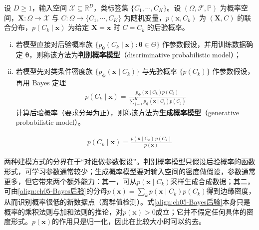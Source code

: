 \documentclass[../main.tex]{subfiles}
\begin{document}
\begin{definition}[判别概率模型与生成概率模型]\label{definition:ch05-生成与判别概率模型}
设 $D\geqslant1$，输入空间 $\mathcal{X}\subseteq\mathbb{R}^{D}$，类标签集 $\{C_1,\cdots,C_K\}$。设 $(\Omega,\mathcal{F},\mathbb{P})$ 为概率空间，$\boldsymbol{X}:\Omega\to\mathcal{X}$ 与 $C:\Omega\to\{C_1,\cdots,C_K\}$ 为随机变量，$p(\boldsymbol{x},C_k)$ 为 $(\boldsymbol{X},C)$ 的联合分布，$p(C_k\mid\boldsymbol{x})$ 为给定 $\boldsymbol{X}=\boldsymbol{x}$ 时 $C=C_k$ 的后验概率。
\begin{enumerate}[(i)]
  \item 若模型直接对后验概率族 $\{p_{\boldsymbol{\theta}}(C_k\mid\boldsymbol{x}):\boldsymbol{\theta}\in\Theta\}$ 作参数假设，并用训练数据确定 $\boldsymbol{\theta}$，则称该方法为\textbf{判别概率模型}（discriminative probabilistic model）；
  \item 若模型先对类条件密度族 $\{p_{\boldsymbol{\phi}}(\boldsymbol{x}\mid C_k)\}$ 与先验概率 $\{p(C_k)\}$ 作参数假设，再用 Bayes 定理
  \begin{align*}
    p(C_k\mid\boldsymbol{x})=\frac{p_{\boldsymbol{\phi}}(\boldsymbol{x}\mid C_k)p(C_k)}{\sum_{j=1}^{K}p_{\boldsymbol{\phi}}(\boldsymbol{x}\mid C_j)p(C_j)}
  \end{align*}
  计算后验概率（要求分母为正），则称该方法为\textbf{生成概率模型}（generative probabilistic model）。
\end{enumerate}
\end{definition}

\begin{align}
  p(C_k\mid\boldsymbol{x})=\frac{p(\boldsymbol{x}\mid C_k)\,p(C_k)}{p(\boldsymbol{x})}
  \label{align:ch05-Bayes后验}
\end{align}

\begin{remark}
两种建模方式的分界在于“对谁做参数假设”。判别概率模型只假设后验概率的函数形式，可学习参数通常较少；生成概率模型要对输入空间的密度做假设，参数通常更多，但它带来两个额外能力：其一，可从$p(\boldsymbol{x}\mid C_k)$采样生成合成数据；其二，可由\eqref{align:ch05-Bayes后验}的分母$p(\boldsymbol{x})=\sum_k p(\boldsymbol{x}\mid C_k)p(C_k)$得到边缘密度，从而识别概率很低的新数据点（离群值检测）。式\eqref{align:ch05-Bayes后验}本身只是概率的乘积法则与加和法则的推论，对$p(\boldsymbol{x})>0$成立；它并不假定任何具体的密度形式。$p(\boldsymbol{x})$的作用只是归一化，因此在比较大小时可以约去。
\end{remark}
\end{document}
